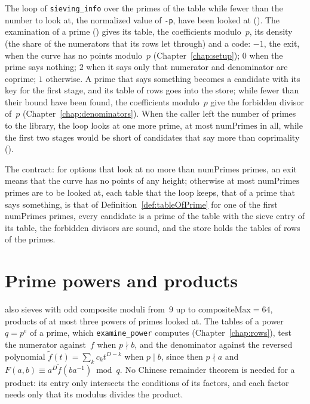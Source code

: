\begin{definition}\label{def:tablesLoop}
  \leanok
  The loop of \verb|sieving_info| over the primes of the table while fewer than the number to look
  at, the normalized value of \verb|-p|, have been looked at ().
  The examination of a prime () gives its table, the coefficients
  modulo~$p$, its density (the share of the numerators that its rows let through) and a code: $-1$,
  the exit, when the curve has no points modulo~$p$ (Chapter~\ref{chap:setup}); $0$ when the prime
  says nothing; $2$ when it says only that numerator and denominator are coprime; $1$ otherwise. A
  prime that says something becomes a candidate with its key for the first stage, and its table of
  rows goes into the store; while fewer than their bound have been found, the coefficients
  modulo~$p$ give the forbidden divisor of~$p$ (Chapter~\ref{chap:denominators}). When the caller
  left the number of primes to the library, the loop looks at one more prime, at most
  $\mathrm{numPrimes}$ in all, while the first two stages would be short of candidates that say
  more than coprimality ().

  The contract: for options that look at no more than $\mathrm{numPrimes}$ primes, an exit means
  that the curve has no points of any height; otherwise at most $\mathrm{numPrimes}$ primes are to
  be looked at, each table that the loop keeps, that of a prime that says something, is that of
  Definition~\ref{def:tableOfPrime} for one of the first $\mathrm{numPrimes}$ primes, every
  candidate is a prime of the table with the sieve entry of its table, the forbidden divisors are
  sound, and the store holds the tables of rows of the primes.
\end{definition}

\section{Prime powers and products}\label{sec:moduliComposite}

\ratpoints{} also sieves with odd composite moduli from~$9$ up to $\mathrm{compositeMax} = 64$,
products of at most three powers of primes looked at. The tables of a power $q = p^e$ of a prime,
which \verb|examine_power| computes (Chapter~\ref{chap:rows}), test the numerator against~$f$ when
$p \nmid b$, and the denominator against the reversed polynomial
$\tilde f(t) = \sum_k c_k t^{D - k}$ when $p \mid b$, since then $p \nmid a$ and
$F(a, b) \equiv a^D \tilde f(b a^{-1}) \bmod q$. No Chinese remainder theorem is needed for a
product: its entry only intersects the conditions of its factors, and each factor needs only that
its modulus divides the product.

